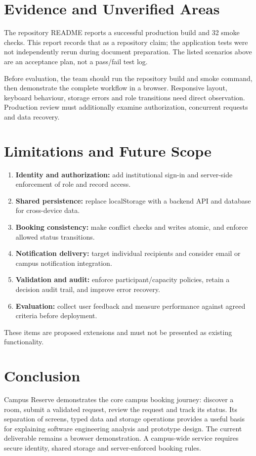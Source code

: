 \documentclass[11pt,a4paper]{report}
\begin{document}
\section{Evidence and Unverified Areas}
The repository README reports a successful production build and 32 smoke checks. This report records that as a repository claim; the application tests were not independently rerun during document preparation. The listed scenarios above are an acceptance plan, not a pass/fail test log.

Before evaluation, the team should run the repository build and smoke command, then demonstrate the complete workflow in a browser. Responsive layout, keyboard behaviour, storage errors and role transitions need direct observation. Production review must additionally examine authorization, concurrent requests and data recovery.
\section{Limitations and Future Scope}
\begin{enumerate}
\item \textbf{Identity and authorization:} add institutional sign-in and server-side enforcement of role and record access.
\item \textbf{Shared persistence:} replace localStorage with a backend API and database for cross-device data.
\item \textbf{Booking consistency:} make conflict checks and writes atomic, and enforce allowed status transitions.
\item \textbf{Notification delivery:} target individual recipients and consider email or campus notification integration.
\item \textbf{Validation and audit:} enforce participant/capacity policies, retain a decision audit trail, and improve error recovery.
\item \textbf{Evaluation:} collect user feedback and measure performance against agreed criteria before deployment.
\end{enumerate}
These items are proposed extensions and must not be presented as existing functionality.
\section{Conclusion}
Campus Reserve demonstrates the core campus booking journey: discover a room, submit a validated request, review the request and track its status. Its separation of screens, typed data and storage operations provides a useful basis for explaining software engineering analysis and prototype design. The current deliverable remains a browser demonstration. A campus-wide service requires secure identity, shared storage and server-enforced booking rules.
\clearpage
\end{document}
